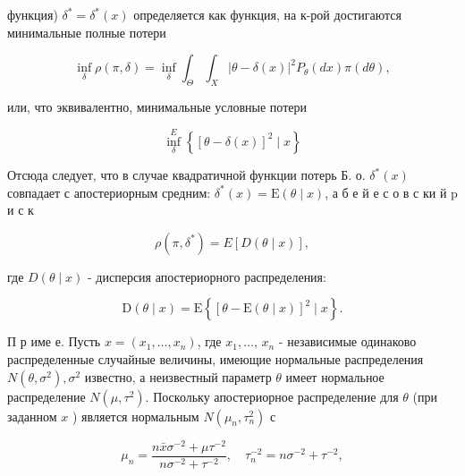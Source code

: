 \documentclass[10pt]{article}
\begin{document}
функция) $\delta^{*}=\delta^{*}(x)$ определяется как функция, на к-рой достигаются минимальные полные потери



\[

\inf _{\delta} \rho(\pi, \delta)=\inf _{\delta} \int_{\Theta} \int_{X}|\theta-\delta(x)|^{2} P_{\theta}(d x) \pi(d \theta),

\]



или, что эквивалентно, минимальные условные потери



\[

\inf _{\delta}^{E}\left\{[\theta-\delta(x)]^{2} \mid x\right\}

\]



Отсюда следует, что в случае квадратичной функции потерь Б. о. $\delta^{*}(x)$ совпадает с апостериорным средним: $\delta^{*}(x)=\mathrm{E}(\theta \mid x)$, а б е й е с о в с ки й $\mathrm{p}$ и с к



\[

\rho\left(\pi, \delta^{*}\right)=E[D(\theta \mid x)],

\]



где $D(\theta \mid x)$ - дисперсия апостериорного распределения:



\[

\mathrm{D}(\theta \mid x)=\mathrm{E}\left\{[\theta-\mathrm{E}(\theta \mid x)]^{2} \mid x\right\} .

\]



П р име е. Пусть $x=\left(x_{1}, \ldots, x_{n}\right)$, где $x_{1}, \ldots$, $x_{n}$ - независимые одинаково распределенные случайные величины, имеющие нормальные распределения $N\left(\theta, \sigma^{2}\right), \sigma^{2}$ известно, а неизвестный параметр $\theta$ имеет нормальное распределение $N\left(\mu, \tau^{2}\right)$. Поскольку апостериорное распределение для $\theta$ (при заданном $x$ ) является нормальным $N\left(\mu_{n}, \tau_{n}^{2}\right)$ с



\[

\mu_{n}=\frac{n \bar{x} \sigma^{-2}+\mu \tau^{-2}}{n \sigma^{-2}+\tau^{-2}}, \quad \tau_{n}^{-2}=n \sigma^{-2}+\tau^{-2},

\]
\end{document}
